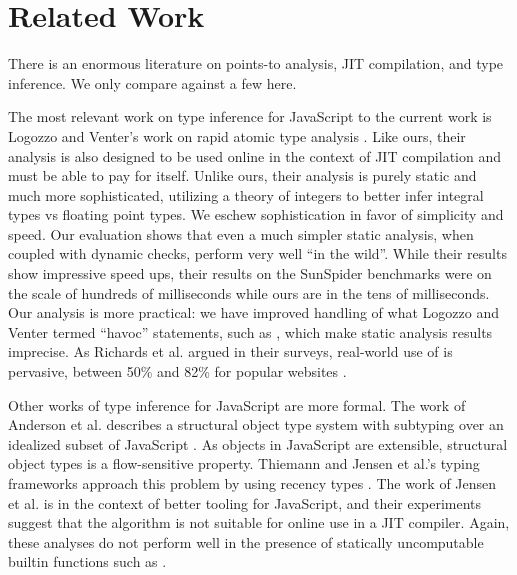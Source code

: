 \section{Related Work}
\label{sec:related-work}

There is an enormous literature on points-to analysis, JIT compilation, and
type inference. We only compare against a few here.

The most relevant work on type inference for JavaScript to the current work is
Logozzo and Venter's work on rapid atomic type analysis \cite{Logozzo10}.
Like ours, their analysis is also designed to be used online in the context of
JIT compilation and must be able to pay for itself. Unlike ours, their
analysis is purely static and much more sophisticated, utilizing a theory of
integers to better infer integral types vs floating point types. We eschew
sophistication in favor of simplicity and speed. Our evaluation shows that
even a much simpler static analysis, when coupled with dynamic checks, perform
very well ``in the wild''. While their results show impressive speed ups,
their results on the SunSpider benchmarks were on the scale of hundreds of
milliseconds while ours are in the tens of milliseconds. Our analysis is more
practical: we have improved handling of what Logozzo and Venter termed ``havoc''
statements, such as , which make static analysis results
imprecise. As Richards et al. argued in their surveys, real-world use of
 is pervasive, between 50\% and 82\% for popular websites
\cite{Richards11, Richards10}.

Other works of type inference for JavaScript are more formal. The work of
Anderson et al. describes a structural object type system with subtyping over
an idealized subset of JavaScript \cite{Anderson05}. As objects in JavaScript
are extensible, structural object types is a flow-sensitive property. Thiemann
and Jensen et al.'s typing frameworks approach this problem by using recency
types \cite{Thiemann05, Jensen09}. The work of Jensen et al. is in the context
of better tooling for JavaScript, and their experiments suggest that the
algorithm is not suitable for online use in a JIT compiler. Again, these
analyses do not perform well in the presence of statically uncomputable
builtin functions such as .

